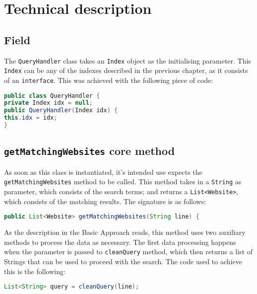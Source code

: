 \section{Technical description} %
\subsection{Field}
The {\tt QueryHandler} class takes an {\tt Index} object as the initialising parameter. This {\tt Index} can be any of the indexes described in the previous chapter, as it consists of an {\tt interface}. This was achieved with the following piece of code:
\begin{lstlisting}[language=Java]
public class QueryHandler {
private Index idx = null;
public QueryHandler(Index idx) {
this.idx = idx;
}
\end{lstlisting}
\subsection{{\tt getMatchingWebsites} core method}
As soon as this class is instantiated, it's intended use expects the {\tt getMatchingWebsites} method to be called. This method takes in a {\tt String} as parameter, which consists of the search terms; and returns a {\tt List<Website>}, which consists of the matching results. The signature is as follows:
\begin{lstlisting}[language=Java]
public List<Website> getMatchingWebsites(String line) {
\end{lstlisting}
As the description in the Basic Approach reads, this method uses two auxiliary methods to process the data as necessary. The first data processing happens when the parameter is passed to {\tt cleanQuery} method, which then returns a list of Strings that can be used to proceed with the search. The code used to achieve this is the following:
\begin{lstlisting}[language=Java]
List<String> query = cleanQuery(line);
\end{lstlisting}
